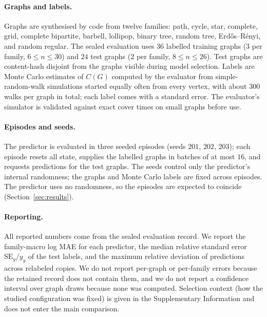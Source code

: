 \documentclass{article}
\begin{document}
\paragraph{Graphs and labels.} Graphs are synthesised by code from twelve families: path, cycle, star, complete, grid, complete bipartite, barbell, lollipop, binary tree, random tree, Erd\H{o}s--R\'enyi, and random regular. The sealed evaluation uses $36$ labelled training graphs ($3$ per family, $6\le n\le 30$) and $24$ test graphs ($2$ per family, $8\le n\le 26$). %
Test graphs are content-hash disjoint from the graphs visible during model selection. Labels are Monte Carlo estimates of $C(G)$ computed by the evaluator from simple-random-walk simulations started equally often from every vertex, with about $300$ walks per graph in total; each label comes with a standard error. %
The evaluator's simulator is validated against exact cover times on small graphs before use.

\paragraph{Episodes and seeds.} The predictor is evaluated in three seeded episodes (seeds $201$, $202$, $203$); each episode resets all state, supplies the labelled graphs in batches of at most $16$, and requests predictions for the test graphs. %
The seeds control only the predictor's internal randomness; the graphs and Monte Carlo labels are fixed across episodes. The predictor uses no randomness, so the episodes are expected to coincide (Section~\ref{sec:results}).

\paragraph{Reporting.} All reported numbers come from the sealed evaluation record. We report the family-macro log MAE for each predictor, the median relative standard error $\mathrm{SE}_g/y_g$ of the test labels, and the maximum relative deviation of predictions across relabeled copies. We do not report per-graph or per-family errors because the retained record does not contain them, and we do not report a confidence interval over graph draws because none was computed. Selection context (how the studied configuration was fixed) is given in the Supplementary Information and does not enter the main comparison.
\end{document}
